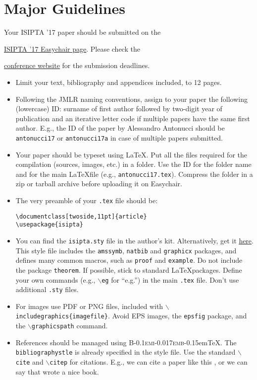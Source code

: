 \documentclass[twoside,11pt]{article}
\newcommand{\BibTeX}{\textsc{B\kern-0.1emi\kern-0.017emb}\kern-0.15em\TeX}
\begin{document}
\section{Major Guidelines}
Your ISIPTA '17 paper should be submitted on the {\href{https://easychair.org/conferences/?conf=isipta17}{\ul{ISIPTA '17 Easychair page}}. Please check the {\href{http://isipta.idsia.ch}{conference website} for the submission deadlines.
\begin{itemize}
\item Limit your text, bibliography and appendices included, to 12 pages.
\item Following the JMLR naming conventions, assign to your paper the following (lowercase) ID: surname of first author followed by two-digit year of publication and an iterative letter code if multiple papers have the same first author. E.g., the ID of the paper by Alessandro Antonucci should be {\tt antonucci17} or {\tt antonucci17a} in case of multiple papers submitted.
\item Your paper should be typeset using \LaTeX. Put all the files required for the compilation (sources, images, etc.) in a folder. Use the ID for the folder name and for the main \LaTeX file (e.g., {\tt antonucci17.tex}). Compress the folder in a zip or tarball archive before uploading it on Easychair.
\item The very preamble of your {\tt .tex} file should be:
\begin{verbatim}
\documentclass[twoside,11pt]{article}
\usepackage{isipta}
\end{verbatim}
\item You can find the {\tt isipta.sty} file in the author's kit. Alternatively, get it \href{http://www.idsia.ch/~alessandro/isipta.sty}{\ul{here}}. This style file includes the {\tt amssymb}, {\tt natbib} and {\tt graphicx} packages, and defines many common macros, such as {\tt proof} and {\tt example}.  Do not include the package {\tt theorem}. If possible, stick to standard \LaTeX packages. Define your own commands (e.g., {\tt $\backslash$eg} for ``e.g.'') in the main {\tt .tex} file. Don't use additional {\tt .sty} files.
\item For images use PDF or PNG files, included with {\tt $\backslash$includegraphics\{imagefile\}}. Avoid EPS images, the {\tt epsfig} package, and the {\tt $\backslash$graphicspath} command. 
\item References should be managed using \BibTeX. The {\tt bibliographystle} is already specified in the style file. Use the standard {\tt $\backslash$cite} and {\tt $\backslash$citep} for citations. E.g., we can cite a paper like this \citep{einstein}, or we can say that \citet{latexcompanion} wrote a nice book.
\end{itemize}

}}
\end{document}
